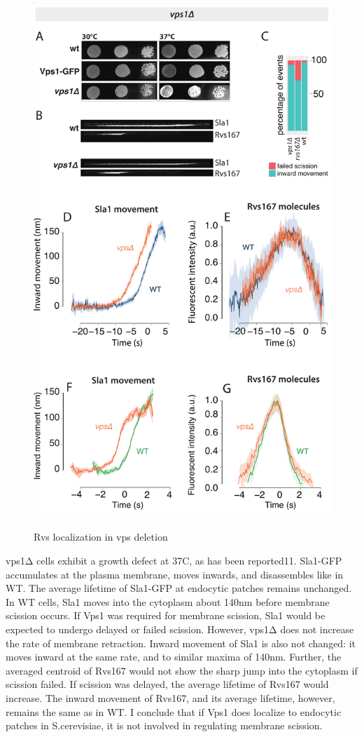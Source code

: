 	\begin{figure}
	\centering
	\includegraphics[width=20cm,height=20cm,keepaspectratio]{figures/results_final/vps}
		\caption{Rvs localization in vps deletion\label{fig3_vpsdel}}
	\end{figure}

	
	\vspace{5mm}
	vps1Δ cells exhibit a growth defect at 37C, as has been reported11. Sla1-GFP accumulates at the plasma membrane, moves inwards, and disassembles like in WT. The average lifetime of Sla1-GFP at endocytic patches remains unchanged. In WT cells, Sla1 moves into the cytoplasm about 140nm before membrane scission occurs. If Vps1 was required for membrane scission, Sla1 would be expected to undergo delayed or failed scission. However, vps1Δ does not increase the rate of membrane retraction. Inward movement of Sla1 is also not changed: it moves inward at the same rate, and to similar maxima of 140nm. Further, the averaged centroid of Rvs167 would not show the sharp jump into the cytoplasm if scission failed. If scission was delayed, the average lifetime of Rvs167 would increase. The inward movement of Rvs167, and its average lifetime, however, remains the same as in WT. I conclude that if Vps1 does localize to endocytic patches in S.cerevisiae, it is not involved in regulating membrane scission.  


